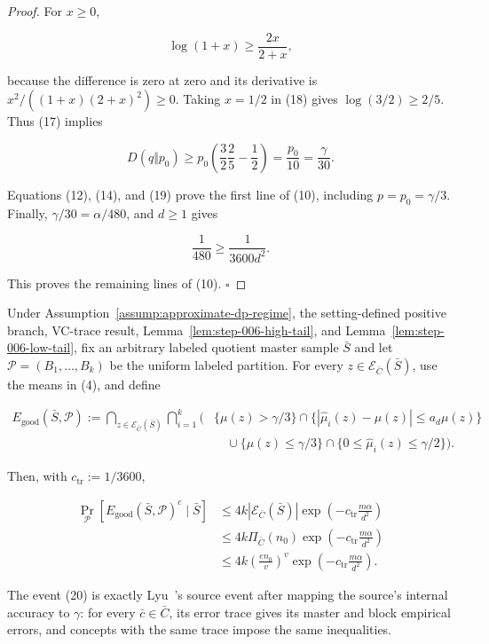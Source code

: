 \begin{proof}
For \(x\geq0\),

\[
 \log(1+x)\geq\frac{2x}{2+x},
\tag{18}
\]

because the difference is zero at zero and its derivative is
\(x^2/((1+x)(2+x)^2)\geq0\).  Taking \(x=1/2\) in (18) gives
\(\log(3/2)\geq2/5\).  Thus (17) implies

\[
 D(q\Vert p_0)
 \geq p_0\left(\frac32\frac25-\frac12\right)
 =\frac{p_0}{10}
 =\frac\gamma{30}.
\tag{19}
\]

Equations (12), (14), and (19) prove the first line of (10), including
\(p=p_0=\gamma/3\).  Finally,
\(\gamma/30=\alpha/480\), and \(d\geq1\) gives

\[
 \frac1{480}\geq\frac1{3600d^2}.
\]

This proves the remaining lines of (10). \(\square\)


\end{proof}

\begin{proposition}\label{prop:step-006-good-event}
Under Assumption~\ref{assump:approximate-dp-regime}, the setting-defined
positive branch,  VC-trace result,
Lemma~\ref{lem:step-006-high-tail}, and
Lemma~\ref{lem:step-006-low-tail}, fix an arbitrary labeled quotient master
sample \(\bar S\) and let \(\mathcal P=(B_1,\ldots,B_k)\) be the uniform
labeled partition.  For every
\(z\in\mathcal E_{\bar C}(\bar S)\), use the means in (4), and define

\[
\begin{aligned}
 E_{\mathrm{good}}(\bar S,\mathcal P)
 :=\bigcap_{z\in\mathcal E_{\bar C}(\bar S)}
   \bigcap_{i=1}^k
 \Big(&\{\mu(z)>\gamma/3\}
       \cap\{|\widehat\mu_i(z)-\mu(z)|\leq a_d\mu(z)\}\\
 &\quad\cup
       \{\mu(z)\leq\gamma/3\}
       \cap\{0\leq\widehat\mu_i(z)\leq\gamma/2\}\Big).
\end{aligned}
\tag{20}
\]

Then, with \(c_{\mathrm{tr}}:=1/3600\),

\[
\begin{aligned}
 \Pr_{\mathcal P}
 [E_{\mathrm{good}}(\bar S,\mathcal P)^c\mid\bar S]
 &\leq4k|\mathcal E_{\bar C}(\bar S)|
   \exp\!\left(-c_{\mathrm{tr}}\frac{m\alpha}{d^2}\right)\\
 &\leq4k\Pi_{\bar C}(n_0)
   \exp\!\left(-c_{\mathrm{tr}}\frac{m\alpha}{d^2}\right)\\
 &\leq4k\left(\frac{en_0}{v}\right)^v
   \exp\!\left(-c_{\mathrm{tr}}\frac{m\alpha}{d^2}\right).
\end{aligned}
\tag{21}
\]

The event (20) is exactly Lyu~\citep{lyu2025}'s source event after mapping the source's
internal accuracy to \(\gamma\): for every \(\bar c\in\bar C\), its error
trace gives its master and block empirical errors, and concepts with the
same trace impose the same inequalities.


\end{proposition}

